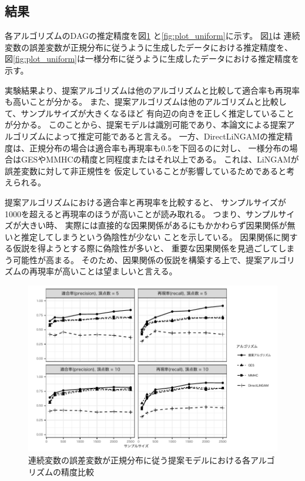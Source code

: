 
\subsection{結果}

各アルゴリズムのDAGの推定精度を図\ref{fig:plot_gaussian}
と\ref{fig:plot_uniform}に示す。
図\ref{fig:plot_gaussian}は
連続変数の誤差変数が正規分布に従うように生成したデータにおける推定精度を、
図\ref{fig:plot_uniform}は一様分布に従うように生成したデータにおける推定精度を示す。

実験結果より、提案アルゴリズムは他のアルゴリズムと比較して適合率も再現率も高いことが分かる。
また、提案アルゴリズムは他のアルゴリズムと比較して、サンプルサイズが大きくなるほど
有向辺の向きを正しく推定していることが分かる。
このことから、提案モデルは識別可能であり、本論文による提案アルゴリズムによって推定可能であると言える。
一方、DirectLiNGAMの推定精度は、正規分布の場合は適合率も再現率も0.5を下回るのに対し、
一様分布の場合はGESやMMHCの精度と同程度またはそれ以上である。
これは、LiNGAM\cite{Shimizu2011-pd}が誤差変数に対して非正規性を
仮定していることが影響しているためであると考えられる。

提案アルゴリズムにおける適合率と再現率を比較すると、
サンプルサイズが1000を超えると再現率のほうが高いことが読み取れる。
つまり、サンプルサイズが大きい時、
実際には直接的な因果関係があるにもかかわらず因果関係が無いと推定してしまうという偽陰性が少ない
ことを示している。
因果関係に関する仮説を得ようとする際に偽陰性が多いと、
重要な因果関係を見過ごしてしまう可能性が高まる。
そのため、因果関係の仮説を構築する上で、提案アルゴリズムの再現率が高いことは望ましいと言える。

\begin{figure}[H]
  \centering
  \includegraphics[width=13cm, bb=9 9 358 434]{./picture/plot_gaussian.pdf}
  \caption{連続変数の誤差変数が正規分布に従う提案モデルにおける各アルゴリズムの精度比較}
  \label{fig:plot_gaussian}
\end{figure}

